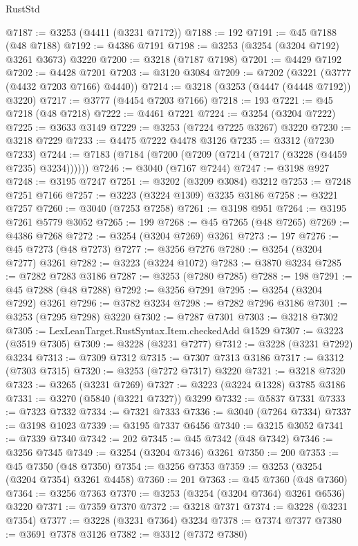 \begin{lexlean}{RustStd}
\begin{coremodule}
@7187 := @3253 (@4411 (@3231 @7172))
@7188 := 192
@7191 := @45 @7188 (@48 @7188)
@7192 := @4386 @7191
@7198 := @3253 (@3254 (@3204 @7192) @3261 @3673) @3220
@7200 := @3218 (@7187 @7198)
@7201 := @4429 @7192
@7202 := @4428 @7201
@7203 := @3120 @3084
@7209 := @7202 (@3221 (@3777 (@4432 @7203 @7166) @4440))
@7214 := @3218 (@3253 (@4447 (@4448 @7192)) @3220)
@7217 := @3777 (@4454 @7203 @7166)
@7218 := 193
@7221 := @45 @7218 (@48 @7218)
@7222 := @4461 @7221
@7224 := @3254 (@3204 @7222)
@7225 := @3633 @3149
@7229 := @3253 (@7224 @7225 @3267) @3220
@7230 := @3218 @7229
@7233 := @4475 @7222 @4478 @3126
@7235 := @3312 (@7230 @7233)
@7244 := @7183 (@7184 (@7200 (@7209 (@7214 (@7217 (@3228 (@4459 @7235) @3234))))))
@7246 := @3040 (@7167 @7244)
@7247 := @3198 @927
@7248 := @3195 @7247
@7251 := @3202 (@3209 @3084) @3212
@7253 := @7248 @7251 @7166
@7257 := @3223 (@3224 @1309) @3235 @3186
@7258 := @3221 @7257
@7260 := @3040 (@7253 @7258)
@7261 := @3198 @951
@7264 := @3195 @7261 @5779 @3052
@7265 := 199
@7268 := @45 @7265 (@48 @7265)
@7269 := @4386 @7268
@7272 := @3254 (@3204 @7269) @3261
@7273 := 197
@7276 := @45 @7273 (@48 @7273)
@7277 := @3256 @7276
@7280 := @3254 (@3204 @7277) @3261
@7282 := @3223 (@3224 @1072)
@7283 := @3870 @3234
@7285 := @7282 @7283 @3186
@7287 := @3253 (@7280 @7285)
@7288 := 198
@7291 := @45 @7288 (@48 @7288)
@7292 := @3256 @7291
@7295 := @3254 (@3204 @7292) @3261
@7296 := @3782 @3234
@7298 := @7282 @7296 @3186
@7301 := @3253 (@7295 @7298) @3220
@7302 := @7287 @7301
@7303 := @3218 @7302
@7305 := LexLeanTarget.RustSyntax.Item.checkedAdd @1529
@7307 := @3223 (@3519 @7305)
@7309 := @3228 (@3231 @7277)
@7312 := @3228 (@3231 @7292) @3234
@7313 := @7309 @7312
@7315 := @7307 @7313 @3186
@7317 := @3312 (@7303 @7315)
@7320 := @3253 (@7272 @7317) @3220
@7321 := @3218 @7320
@7323 := @3265 (@3231 @7269)
@7327 := @3223 (@3224 @1328) @3785 @3186
@7331 := @3270 (@5840 (@3221 @7327)) @3299
@7332 := @5837 @7331
@7333 := @7323 @7332
@7334 := @7321 @7333
@7336 := @3040 (@7264 @7334)
@7337 := @3198 @1023
@7339 := @3195 @7337 @6456
@7340 := @3215 @3052
@7341 := @7339 @7340
@7342 := 202
@7345 := @45 @7342 (@48 @7342)
@7346 := @3256 @7345
@7349 := @3254 (@3204 @7346) @3261
@7350 := 200
@7353 := @45 @7350 (@48 @7350)
@7354 := @3256 @7353
@7359 := @3253 (@3254 (@3204 @7354) @3261 @4458)
@7360 := 201
@7363 := @45 @7360 (@48 @7360)
@7364 := @3256 @7363
@7370 := @3253 (@3254 (@3204 @7364) @3261 @6536) @3220
@7371 := @7359 @7370
@7372 := @3218 @7371
@7374 := @3228 (@3231 @7354)
@7377 := @3228 (@3231 @7364) @3234
@7378 := @7374 @7377
@7380 := @3691 @7378 @3126
@7382 := @3312 (@7372 @7380)

\end{coremodule}
\end{lexlean}
